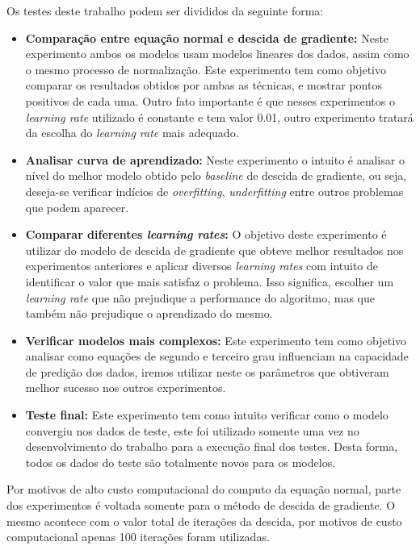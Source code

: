 \documentclass[conference]{IEEEtran}
\begin{document}
Os testes deste trabalho podem ser divididos da seguinte forma:

\begin{itemize}
	\item \textbf{Comparação entre equação normal e descida de gradiente: } Neste experimento ambos os modelos usam modelos lineares dos dados, assim como o mesmo processo de normalização. Este experimento tem como objetivo comparar os resultados obtidos por ambas as técnicas, e mostrar pontos positivos de cada uma. Outro fato importante é que nesses experimentos o \emph{learning rate} utilizado é constante e tem valor 0.01, outro experimento tratará da escolha do \emph{learning rate} mais adequado.
	\item \textbf{Analisar curva de aprendizado: } Neste experimento o intuito é analisar o nível do melhor modelo obtido pelo \emph{baseline} de descida de gradiente, ou seja, deseja-se verificar indícios de \emph{overfitting}, \emph{underfitting} entre outros problemas que podem aparecer.
	\item \textbf{Comparar diferentes \emph{learning rates}: } O objetivo deste experimento é utilizar do modelo de descida de gradiente que obteve melhor resultados nos experimentos anteriores e aplicar diversos \emph{learning rates} com intuito de identificar o valor que mais satisfaz o problema. Isso significa, escolher um \emph{learning rate} que não prejudique a performance do algoritmo, mas que também não prejudique o aprendizado do mesmo.
	\item \textbf{Verificar modelos mais complexos: } Este experimento tem como objetivo analisar como equações de segundo e terceiro grau influenciam na capacidade de predição dos dados, iremos utilizar neste os parâmetros que obtiveram melhor sucesso nos outros experimentos.
	\item \textbf{Teste final: } Este experimento tem como intuito verificar como o modelo convergiu nos dados de teste, este foi utilizado somente uma vez no desenvolvimento do trabalho para a execução final dos testes. Desta forma, todos os dados do teste são totalmente novos para os modelos.
\end{itemize}

Por motivos de alto custo computacional do computo da equação normal, parte dos experimentos é voltada somente para o método de descida de gradiente. O mesmo acontece com o valor total de iterações da descida, por motivos de custo computacional apenas 100 iterações foram utilizadas.


\end{document}
